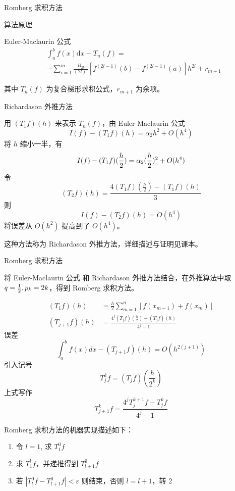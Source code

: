 \documentclass[a4paper]{article}
\begin{document}
\begin{multicols}{2}
\begin{section}{Romberg 求积方法}
\begin{subsection}{算法原理}
\begin{subsubsection}{Euler-Maclaurin 公式}
			\begin{align}
				\nonumber
				&\int_{a}^{b} f(x) \mathrm{d} x-T_{n}(f) = \\
				\nonumber
				&-\sum_{i=1}^{m} \frac{B_{2 l}}{(2 l) !}\left[f^{(2 l-1)}(b)-f^{(2 l-1)}(a)\right] h^{2 l}+r_{m+1}
			\end{align}
			
			其中 $T_n(f)$ 为复合梯形求积公式，$r_{m+1}$ 为余项。
			
		\end{subsubsection}
		
		\begin{subsubsection}{Richardason 外推方法}
			
			用 $(T_1f)(h)$ 来表示 $T_n(f)$，由 Euler-Maclaurin 公式 $$I(f)-(T_1f)(h) = \alpha_2h^2 + O(h^4)$$ 将 $h$ 缩小一半，有 $$I(f)-(T_1f)({h\over 2}) = \alpha_2({h\over 2})^2+O(h^4)$$ 令 $$\left(T_{2} f\right)(h)=\frac{4\left(T_{1} f\right)\left(\frac{h}{2}\right)-\left(T_{1} f\right)(h)}{3}$$ 则 $$I(f)-(T_2f)(h) = O(h^4)$$ 将误差从 $O(h^2)$ 提高到了 $O(h^4)$。
			
			这种方法称为 Richardason 外推方法，详细描述与证明见课本。
			
		\end{subsubsection}

		\begin{subsubsection}{Romberg 求积方法}
			
			将 Euler-Maclaurin 公式 和 Richardason 外推方法结合，在外推算法中取 $q={1\over 2}, p_k = 2k$，得到 Romberg 求积方法。
			
			\begin{align}
				\nonumber
				\left(T_{1} f\right)(h)&=\frac{h}{2} \sum_{m=1}^{n}\left[f\left(x_{m-1}\right)+f\left(x_{m}\right)\right] \\
				\nonumber
				\left(T_{j+1} f\right)(h)&=\frac{4^{j}\left(T_{j} f\right)\left(\frac{h}{2}\right)-\left(T_{j} f\right)(h)}{4^{j}-1}
			\end{align}
			误差 $$\int_{a}^{b} f(x) d x - \left(T_{j+1} f\right)(h)=O\left(h^{2(j+1)}\right)$$
			引入记号 $$T_{j}^{k} f=\left(T_{j} f\right)\left(\frac{h}{2^{k}}\right)$$上式写作 $$T_{j+1}^{k} f=\frac{4^{j} T_{j}^{k+1} f-T_{j}^{k} f}{4^{j}-1}$$
			
			Romberg 求积方法的机器实现描述如下：
			
			\begin{enumerate}
				\item 令 $l=1$, 求 $T_1^0 f$
				\item 求 $T_1^l f$，并递推得到 $T_{l+1}^0 f$
				\item 若 $\left|T_{l}^{0} f-T_{l+1}^{0} f\right|<\varepsilon$ 则结束，否则 $l=l+1$，转 2
			\end{enumerate}
			

\end{subsubsection}
\end{subsection}
\end{section}
\end{multicols}
\end{document}
